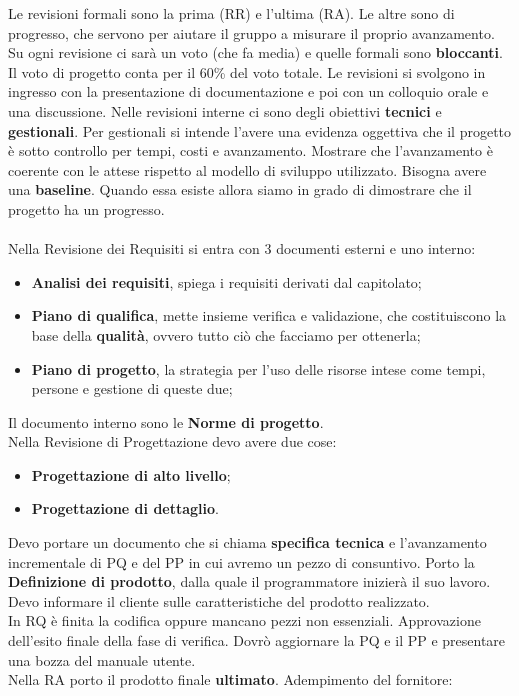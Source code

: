 Le revisioni formali sono la prima (RR) e l'ultima (RA). Le altre sono di progresso, che servono per aiutare il gruppo a misurare il proprio avanzamento. Su ogni revisione ci sarà un voto (che fa media) e quelle formali sono \textbf{bloccanti}. Il voto di progetto conta per il 60\% del voto totale. Le revisioni si svolgono in ingresso con la presentazione di documentazione e poi con un colloquio orale e una discussione. Nelle revisioni interne ci sono degli obiettivi \textbf{tecnici} e \textbf{gestionali}. Per gestionali si intende l'avere una evidenza oggettiva che il progetto è sotto controllo per tempi, costi e avanzamento. Mostrare che l'avanzamento è coerente con le attese rispetto al modello di sviluppo utilizzato. Bisogna avere una \textbf{baseline}. Quando essa esiste allora siamo in grado di dimostrare che il progetto ha un progresso.\\\\

Nella Revisione dei Requisiti si entra con 3 documenti esterni e uno interno:

\begin{itemize}

	\item \textbf{Analisi dei requisiti}, spiega i requisiti derivati dal capitolato;
	\item \textbf{Piano di qualifica}, mette insieme verifica e validazione, che costituiscono la base della \textbf{qualità}, ovvero tutto ciò che facciamo per ottenerla;
	\item \textbf{Piano di progetto}, la strategia per l'uso delle risorse intese come tempi, persone e gestione di queste due;

\end{itemize}

Il documento interno sono le \textbf{Norme di progetto}.\\
Nella Revisione di Progettazione devo avere due cose:

\begin{itemize}

	\item \textbf{Progettazione di alto livello};
	\item \textbf{Progettazione di dettaglio}.

\end{itemize}

Devo portare un documento che si chiama \textbf{specifica tecnica} e l'avanzamento incrementale di PQ e del PP in cui avremo un pezzo di consuntivo. Porto la \textbf{Definizione di prodotto}, dalla quale il programmatore inizierà il suo lavoro. Devo informare il cliente sulle caratteristiche del prodotto realizzato.\\
In RQ è finita la codifica oppure mancano pezzi non essenziali. Approvazione dell'esito finale della fase di verifica. Dovrò aggiornare la PQ e il PP e presentare una bozza del manuale utente.\\
Nella RA porto il prodotto finale \textbf{ultimato}. Adempimento del fornitore:

